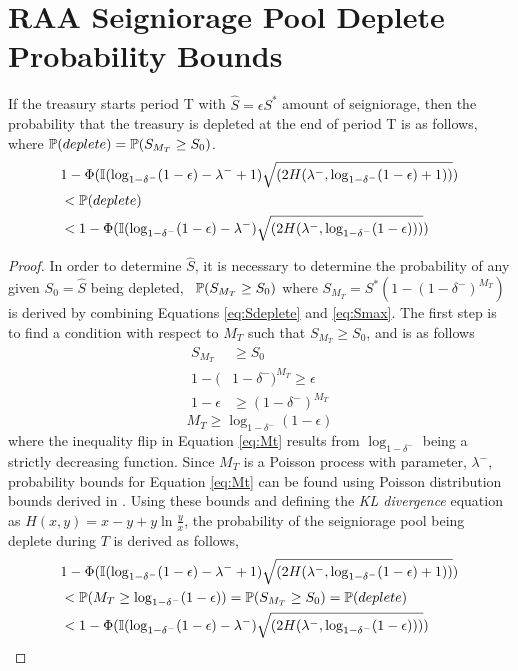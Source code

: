 \section{RAA Seigniorage Pool Deplete Probability Bounds}
\begin{theorem} \label{thm:bearbounds}
If the treasury starts period T with $\hat{S} = \epsilon S^*$ amount of seigniorage, then the probability that the treasury is depleted at the end of period T is as follows, where $\mathbb{P}(deplete) = \mathbb{P}(S_{M_T} \geq S_0)$.
\begin{align*}
& 1 - \Phi (\mathbb{I}(\log_{1- \delta^-}(1-\epsilon) - \lambda^- +1) \sqrt{(2H(\lambda^-, \log_{1- \delta^-}(1-\epsilon) +1))}) \\
& < \mathbb{P}(deplete) \\
& < 1 - \Phi (\mathbb{I}(\log_{1- \delta^-}(1-\epsilon) - \lambda^-) \sqrt{(2H(\lambda^-, \log_{1- \delta^-}(1-\epsilon)))})
\end{align*}
\end{theorem}
\begin{proof}
In order to determine $\hat{S}$, it is necessary to determine the probability of any given $S_0 = \hat{S}$ being depleted, \ie\ $\mathbb{P}(S_{M_T} \geq S_0)$ where $S_{M_T} = S^*(1-(1-\delta^-)^{M_T})$ is derived by combining Equations \ref{eq:Sdeplete} and \ref{eq:Smax}. The first step is to find a condition with respect to $M_T$ such that $S_{M_T} \geq S_0$, and is as follows
%
\begin{align*}
S_{M_T} & \geq S_0 \\
1 - (& 1-\delta^-)^{M_T} \geq \epsilon \\
1 - \epsilon & \geq (1-\delta^-)^{M_T}
\end{align*}
\begin{equation} \label{eq:Mt}
M_T \geq \log_{1- \delta^-} (1-\epsilon)
\end{equation}
%
where the inequality flip in Equation \ref{eq:Mt} results from $\log_{1-\delta^-}$ being a strictly decreasing function. Since $M_T$ is a Poisson process with parameter, $\lambda^-$, probability bounds for Equation \ref{eq:Mt} can be found using Poisson distribution bounds derived in \cite{Short13}. Using these bounds and defining the \textit{KL divergence} equation as $H(x,y) = x - y + y\ln{\frac{y}{x}}$, the probability of the seigniorage pool being deplete during $T$ is derived as follows,
%
\begin{align*}
& 1 - \Phi (\mathbb{I}(\log_{1- \delta^-}(1-\epsilon) - \lambda^- +1) \sqrt{(2H(\lambda^-, \log_{1- \delta^-}(1-\epsilon) +1))}) \\
& < \mathbb{P}(M_T \geq \log_{1- \delta^-} (1-\epsilon)) = \mathbb{P}(S_{M_T} \geq S_0) = \mathbb{P}(deplete) \\
& < 1 - \Phi (\mathbb{I}(\log_{1- \delta^-}(1-\epsilon) - \lambda^-) \sqrt{(2H(\lambda^-, \log_{1- \delta^-}(1-\epsilon)))})
\end{align*}
\end{proof}